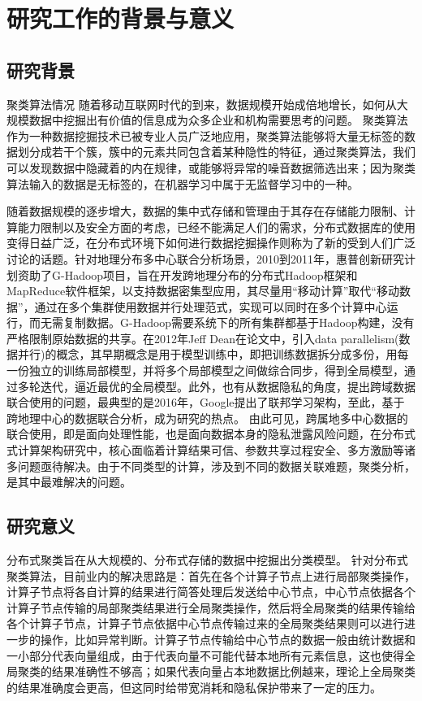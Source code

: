 \thesischapterexordium

\section{研究工作的背景与意义}

\subsection{研究背景}

聚类算法情况
随着移动互联网时代的到来，数据规模开始成倍地增长，如何从大规模数据中挖掘出有价值的信息成为众多企业和机构需要思考的问题。
聚类算法作为一种数据挖掘技术已被专业人员广泛地应用，聚类算法能够将大量无标签的数据划分成若干个簇，簇中的元素共同包含着某种隐性的特征，通过聚类算法，我们可以发现数据中隐藏着的内在规律，或能够将异常的噪音数据筛选出来；因为聚类算法输入的数据是无标签的，在机器学习中属于无监督学习中的一种。

随着数据规模的逐步增大，数据的集中式存储和管理由于其存在存储能力限制、计算能力限制以及安全方面的考虑，已经不能满足人们的需求，分布式数据库的使用变得日益广泛，在分布式环境下如何进行数据挖掘操作则称为了新的受到人们广泛讨论的话题。针对地理分布多中心联合分析场景，2010到2011年，惠普创新研究计划资助了G-Hadoop项目，旨在开发跨地理分布的分布式Hadoop框架和MapReduce软件框架，以支持数据密集型应用，其尽量用“移动计算”取代“移动数据”，通过在多个集群使用数据并行处理范式，实现可以同时在多个计算中心运行，而无需复制数据。G-Hadoop需要系统下的所有集群都基于Hadoop构建，没有严格限制原始数据的共享。在2012年Jeff Dean在论文\cite{dean2012large}中，引入data parallelism(数据并行)的概念，其早期概念是用于模型训练中，即把训练数据拆分成多份，用每一份独立的训练局部模型，并将多个局部模型之间做综合同步，得到全局模型，通过多轮迭代，逼近最优的全局模型。此外，也有从数据隐私的角度，提出跨域数据联合使用的问题，最典型的是2016年，Google提出了联邦学习架构，至此，基于跨地理中心的数据联合分析，成为研究的热点。
由此可见，跨属地多中心数据的联合使用，即是面向处理性能，也是面向数据本身的隐私泄露风险问题，在分布式式计算架构研究中，核心面临着计算结果可信、参数共享过程安全、多方激励等诸多问题亟待解决。由于不同类型的计算，涉及到不同的数据关联难题，聚类分析，是其中最难解决的问题。




\subsection{研究意义}
分布式聚类旨在从大规模的、分布式存储的数据中挖掘出分类模型。
针对分布式聚类算法，目前业内的解决思路是：首先在各个计算子节点上进行局部聚类操作，计算子节点将各自计算的结果进行简答处理后发送给中心节点，中心节点依据各个计算子节点传输的局部聚类结果进行全局聚类操作，然后将全局聚类的结果传输给各个计算子节点，计算子节点依据中心节点传输过来的全局聚类结果则可以进行进一步的操作，比如异常判断。计算子节点传输给中心节点的数据一般由统计数据和一小部分代表向量组成，由于代表向量不可能代替本地所有元素信息，这也使得全局聚类的结果准确性不够高；如果代表向量占本地数据比例越来，理论上全局聚类的结果准确度会更高，但这同时给带宽消耗和隐私保护带来了一定的压力。

